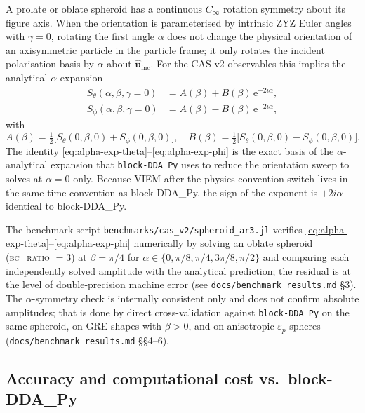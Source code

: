 \documentclass[11pt,a4paper]{article}
\begin{document}
A prolate or oblate spheroid has a continuous $C_\infty$ rotation
symmetry about its figure axis. When the orientation is parameterised
by intrinsic ZYZ Euler angles with $\gamma = 0$, rotating the first
angle $\alpha$ does not change the physical orientation of an
axisymmetric particle in the particle frame; it only rotates the
incident polarisation basis by $\alpha$ about
$\hat{\bm{u}}_{\text{inc}}$. For the CAS-v2 observables this implies
the analytical $\alpha$-expansion~\cite{Moteki2024}
\begin{align}
  S_\theta(\alpha,\beta,\gamma{=}0)
    &= A(\beta) + B(\beta)\,\mathrm{e}^{+2 i \alpha},
  \label{eq:alpha-exp-theta}\\
  S_\phi(\alpha,\beta,\gamma{=}0)
    &= A(\beta) - B(\beta)\,\mathrm{e}^{+2 i \alpha},
  \label{eq:alpha-exp-phi}
\end{align}
with
\begin{equation}
  A(\beta) = \tfrac{1}{2}\bigl[S_\theta(0,\beta,0)+S_\phi(0,\beta,0)\bigr],
  \quad
  B(\beta) = \tfrac{1}{2}\bigl[S_\theta(0,\beta,0)-S_\phi(0,\beta,0)\bigr].
  \label{eq:AB}
\end{equation}
The identity \eqref{eq:alpha-exp-theta}--\eqref{eq:alpha-exp-phi} is the
exact basis of the $\alpha$-analytical expansion that
\texttt{block-DDA\_Py} uses to reduce the orientation sweep to solves at
$\alpha = 0$ only. Because VIEM after the physics-convention switch
lives in the same time-convention as block-DDA\_Py, the sign of the
exponent is $+2i\alpha$ --- identical to block-DDA\_Py.

The benchmark script
\texttt{benchmarks/cas\_v2/spheroid\_ar3.jl} verifies
\eqref{eq:alpha-exp-theta}--\eqref{eq:alpha-exp-phi} numerically by
solving an oblate spheroid (\textsc{bc\_ratio} $= 3$) at
$\beta = \pi/4$ for $\alpha\in\{0,\pi/8,\pi/4,3\pi/8,\pi/2\}$ and
comparing each independently solved amplitude with the analytical
prediction; the residual is at the level of double-precision
machine error (see \texttt{docs/benchmark\_results.md} \S 3).  The
$\alpha$-symmetry check is internally consistent only and does not
confirm absolute amplitudes; that is done by direct
cross-validation against \texttt{block-DDA\_Py} on the same
spheroid, on GRE shapes with $\beta > 0$, and on anisotropic
$\varepsilon_p$ spheres
(\texttt{docs/benchmark\_results.md} \S\S 4--6).

\subsection{Accuracy and computational cost vs.\ block-DDA\_Py}
\label{sec:viem-vs-dda}
\end{document}
